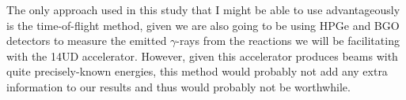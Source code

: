 \documentclass[12pt,a4paper]{article}
\begin{document}
\medskip
The only approach used in this study that I might be able to use advantageously is the time-of-flight method, given we are also going to be using HPGe and BGO detectors to measure the emitted $\gamma$-rays from the reactions we will be facilitating with the 14UD accelerator. However, given this accelerator produces beams with quite precisely-known energies, this method would probably not add any extra information to our results and thus would probably not be worthwhile.




\vspace*{-\baselineskip}

{}
\end{document}
